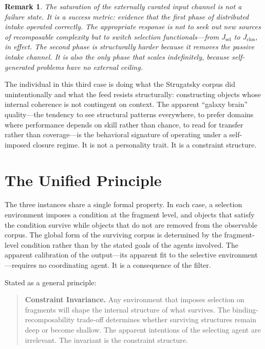 \documentclass[12pt]{article}
\newtheorem{remark}{Remark}[section]
\newcommand{\Jsel}{J_{\mathrm{sel}}}
\newcommand{\Jclos}{J_{\mathrm{clos}}}
\begin{document}
\begin{remark}
The saturation of the externally curated input channel is not a failure
state. It is a success metric: evidence that the first phase of
distributed intake operated correctly. The appropriate response is not
to seek out new sources of recomposable complexity but to switch
selection functionals---from $\Jsel$ to $\Jclos$, in effect. The second
phase is structurally harder because it removes the passive intake
channel. It is also the only phase that scales indefinitely, because
self-generated problems have no external ceiling.
\end{remark}

The individual in this third case is doing what the Strugatsky corpus
did unintentionally and what the feed resists structurally: constructing
objects whose internal coherence is not contingent on context. The
apparent ``galaxy brain'' quality---the tendency to see structural
patterns everywhere, to prefer domains where performance depends on
skill rather than chance, to read for transfer rather than
coverage---is the behavioral signature of operating under a
self-imposed closure regime. It is not a personality trait. It is a
constraint structure.

\section{The Unified Principle}
\label{sec:unified}

The three instances share a single formal property. In each case, a
selection environment imposes a condition at the fragment level, and
objects that satisfy the condition survive while objects that do not are
removed from the observable corpus. The global form of the surviving
corpus is determined by the fragment-level condition rather than by the
stated goals of the agents involved. The apparent calibration of the
output---its apparent fit to the selective environment---requires no
coordinating agent. It is a consequence of the filter.

Stated as a general principle:

\begin{quote}
\textbf{Constraint Invariance.} Any environment that imposes selection on
fragments will shape the internal structure of what survives. The
binding-recomposability trade-off determines whether surviving structures
remain deep or become shallow. The apparent intentions of the selecting
agent are irrelevant. The invariant is the constraint structure.
\end{quote}
\end{document}
